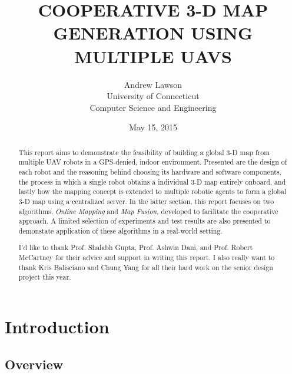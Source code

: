 \documentclass[letterpaper, oneside, 10pt]{report}
\title{\large COOPERATIVE 3-D MAP GENERATION USING MULTIPLE UAVS}
\author{
  \large
  Andrew Lawson \\
  University of Connecticut \\
  Computer Science and Engineering
}
\date{\large May 15, 2015}
\begin{document}
\begin{titlepage}
  \maketitle
  \thispagestyle{empty}
\end{titlepage}
\clearpage

\begin{abstract}

\noindent This report aims to demonstrate the feasibility of building a global 3-D map from multiple UAV robots in a GPS-denied, indoor environment. Presented are the design of each robot and the reasoning behind choosing its hardware and software components, the process in which a single robot obtains a individual 3-D map entirely onboard, and lastly how the mapping concept is extended to multiple robotic agents to form a global 3-D map using a centralized server. In the latter section, this report focuses on two algorithms, \textsl{Online Mapping} and \textsl{Map Fusion}, developed to facilitate the cooperative approach. A limited selection of experiments and test results are also presented to demonstate application of these algorithms in a real-world setting.

\end{abstract}
\clearpage

\renewcommand{\abstractname}{Acknowledgements}
\begin{abstract}
 I'd like to thank Prof. Shalabh Gupta, Prof. Ashwin Dani, and Prof. Robert McCartney for their advice and support in writing this report. I also really want to thank Kris Balisciano and Chung Yang for all their hard work on the senior design project this year.
\end{abstract}
\clearpage

\tableofcontents
\listoffigures
\listoftables
\clearpage

\doublespacing

\chapter{Introduction}

\section{Overview}
\end{document}

